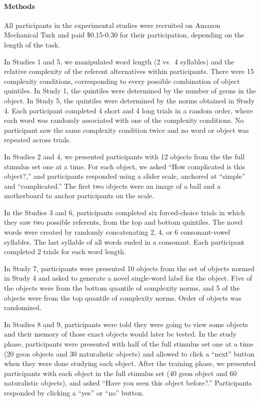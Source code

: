 \documentclass[12pt]{article}
\begin{document}
\paragraph*{Methods}
All participants in the experimental studies were recruited on Amazon Mechanical Turk and paid \$0.15-0.30 for their participation, depending on the length of the task. 

In Studies 1 and 5, we manipulated word length (2 vs.\ 4 syllables) and the relative complexity of the referent alternatives within participants.  There were 15 complexity conditions, corresponding to every possible combination of object quintiles. In Study 1, the quintiles were determined by the number of geons in the object. In Study 5, the quintiles were determined by the norms obtained in Study 4. Each participant completed 4 short and 4 long trials in a random order, where each word was randomly associated with one of the complexity conditions. No participant saw the same complexity condition twice and no word or object was repeated across trials. 

In Studies 2 and 4, we presented participants with 12 objects from the the full stimulus set one at a time. For each object, we asked ``How complicated is this object?,'' and participants responded using a slider scale, anchored at ``simple'' and ``complicated.'' The first two objects were an image of a ball and a motherboard to anchor participants on the scale.

In the Studies 3 and 6,  participants completed six forced-choice trials in which they saw two possible referents, from the top and bottom quintiles. The novel words were created by randomly concatenating 2, 4, or 6 consonant-vowel syllables. The last syllable of all words ended in a consonant. Each participant completed 2 trials for each word length. 

In Study 7, participants were presented 10 objects from the set of objects normed in Study 4 and asked to generate a novel single-word label for the object. Five of the objects were from the bottom quantile of complexity norms, and 5 of the objects were from the top quantile of complexity norms. Order of objects was randomized.

In Studies 8 and 9, participants were told they were going to view some objects and their memory of those exact objects would later be tested. In the study phase, participants were presented with half of the full stimulus set one at a time (20 geon objects and 30 naturalistic objects) and allowed to click a ``next'' button when they were done studying each object. After the training phase, we presented participants with each object in the full stimulus set  (40 geon object and 60 naturalistic objects), and asked ``Have you seen this object before?.'' Participants responded by clicking a ``yes'' or ``no'' button.
\end{document}
